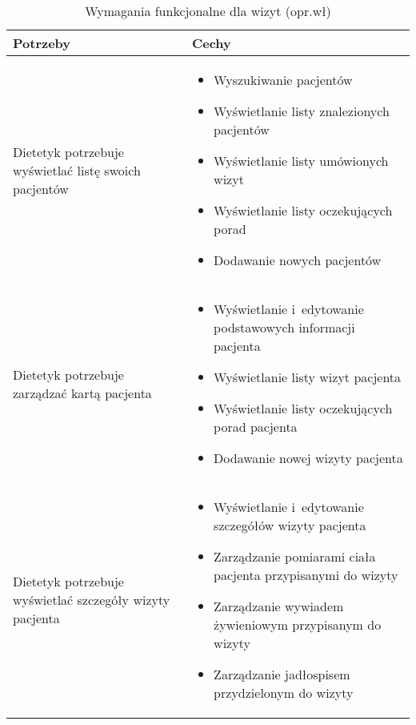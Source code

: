 \begin{minipage}{\textwidth}
    \begin{table}[H]
        \centering\caption{Wymagania funkcjonalne dla wizyt (opr.wł)\label{tabela:wymaganiaFunkcjonalneWizyty}}
        \begin{tabular}{|P{.3\textwidth}|P{.6\textwidth}|}
            \hline
            Potrzeby & Cechy \\

            \hline
            Dietetyk potrzebuje wyświetlać listę swoich pacjentów &
            \begin{itemize}
                \item Wyszukiwanie pacjentów
                \item Wyświetlanie listy znalezionych pacjentów
                \item Wyświetlanie listy umówionych wizyt
                \item Wyświetlanie listy oczekujących porad
                \item Dodawanie nowych pacjentów
            \end{itemize} \\
            \hline
            Dietetyk potrzebuje zarządzać kartą pacjenta &
            \begin{itemize}
                \item Wyświetlanie i~edytowanie podstawowych informacji pacjenta
                \item Wyświetlanie listy wizyt pacjenta
                \item Wyświetlanie listy oczekujących porad pacjenta
                \item Dodawanie nowej wizyty pacjenta
            \end{itemize} \\
            \hline
            Dietetyk potrzebuje wyświetlać szczegóły wizyty pacjenta &
            \begin{itemize}
                \item Wyświetlanie i~edytowanie szczegółów wizyty pacjenta
                \item Zarządzanie pomiarami ciała pacjenta przypisanymi do wizyty
                \item Zarządzanie wywiadem żywieniowym przypisanym do wizyty
                \item Zarządzanie jadłospisem przydzielonym do wizyty
            \end{itemize} \\

\end{tabular}
\end{table}
\end{minipage}
